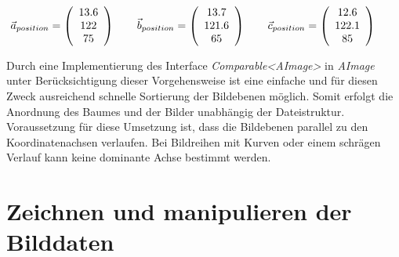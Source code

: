 \begin{equation}
\vec{a}_{position}=\left(\begin{array}{c} 13.6 \\ 122 \\ 75 \end{array}\right) \qquad
\vec{b}_{position}=\left(\begin{array}{c} 13.7 \\ 121.6 \\ 65 \end{array}\right) \qquad
\vec{c}_{position}=\left(\begin{array}{c} 12.6 \\ 122.1 \\ 85 \end{array}\right) \qquad
\vspace{0.5cm}
\label{example_sort}
\end{equation}

Durch eine Implementierung des Interface \textit{Comparable\textless AImage\textgreater} in \textit{AImage} unter Berücksichtigung dieser Vorgehensweise ist eine einfache und für diesen Zweck ausreichend schnelle Sortierung der Bildebenen möglich. Somit erfolgt die Anordnung des Baumes und der Bilder unabhängig der Dateistruktur.\\
Voraussetzung für diese Umsetzung ist, dass die Bildebenen parallel zu den Koordinatenachsen verlaufen. Bei Bildreihen mit Kurven oder einem schrägen Verlauf kann keine dominante Achse bestimmt werden.

\FloatBarrier
\section{Zeichnen und manipulieren der Bilddaten} \label{drawandmanipulate}

